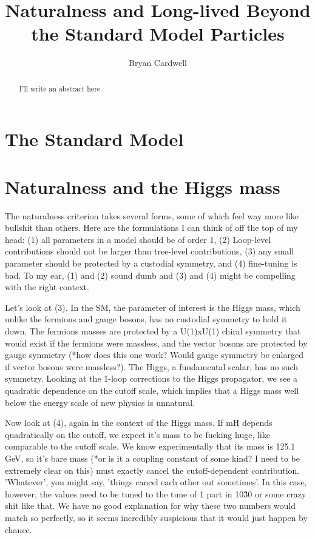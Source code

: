 \documentclass[12pt]{article}
\title{Naturalness and Long-lived Beyond the Standard Model Particles}
\author{Bryan Cardwell}
\begin{document}
\singlespacing

\maketitle

\begin{abstract}

I'll write an abstract here.

\end{abstract}

\doublespacing

\section{The Standard Model}

\section{Naturalness and the Higgs mass}
    The naturalness criterion takes several forms, some of which feel way more like bullshit than others. Here are the formulations I can think of off the top of my head: (1) all parameters in a model should be of order 1, (2) Loop-level contributions should not be larger than tree-level contributions, (3) any small parameter should be protected by a custodial symmetry, and (4) fine-tuning is bad. To my ear, (1) and (2) sound dumb and (3) and (4) might be compelling with the right context.

    Let's look at (3). In the SM, the parameter of interest is the Higgs mass, which unlike the fermions and gauge bosons, has no custodial symmetry to hold it down. The fermions masses are protected by a U(1)xU(1) chiral symmetry that would exist if the fermions were massless, and the vector bosons are protected by gauge symmetry (*how does this one work? Would gauge symmetry be enlarged if vector bosons were massless?). The Higgs, a fundamental scalar, has no such symmetry. Looking at the 1-loop corrections to the Higgs propagator, we see a quadratic dependence on the cutoff scale, which implies that a Higgs mass well below the energy scale of new physics is unnatural.

    Now look at (4), again in the context of the Higgs mass. If mH depends quadratically on the cutoff, we expect it's mass to be fucking huge, like comparable to the cutoff scale. We know experimentally that its mass is 125.1 GeV, so it's bare mass (*or is it a coupling constant of some kind? I need to be extremely clear on this) must exactly cancel the cutoff-dependent contribution. 'Whatever', you might say, 'things cancel each other out sometimes'. In this case, however, the values need to be tuned to the tune of 1 part in 10\^30 or some crazy shit like that. We have no good explanation for why these two numbers would match so perfectly, so it seems incredibly suspicious that it would just happen by chance.
\end{document}
